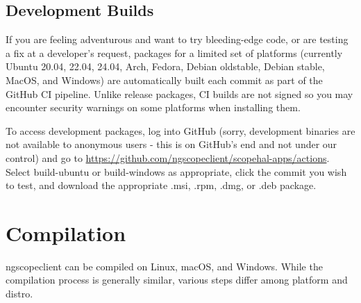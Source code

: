 \subsection{Development Builds}

If you are feeling adventurous and want to try bleeding-edge code, or are testing a fix at a developer's request,
packages for a limited set of platforms (currently Ubuntu 20.04, 22.04, 24.04, Arch, Fedora, Debian oldstable, Debian
stable, MacOS, and Windows) are automatically built each commit as part of the GitHub CI pipeline. Unlike release
packages, CI builds are not signed so you may encounter security warnings on some platforms when installing them.

To access development packages, log into GitHub (sorry, development binaries are not available to
anonymous users - this is on GitHub's end and not under our control) and go to
\url{https://github.com/ngscopeclient/scopehal-apps/actions}. Select build-ubuntu or build-windows as appropriate,
click the commit you wish to test, and download the appropriate .msi, .rpm, .dmg, or .deb package.

\section{Compilation}

ngscopeclient can be compiled on Linux, macOS, and Windows. While the compilation process is generally similar, various
steps differ among platform and distro.

